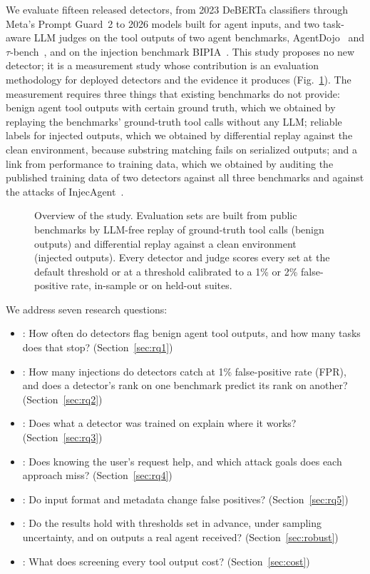 We evaluate fifteen released detectors, from 2023 DeBERTa classifiers through Meta's Prompt Guard~2 to 2026 models built for agent inputs, and two task-aware LLM judges on the tool outputs of two agent benchmarks, AgentDojo~\cite{agentdojo} and $\tau$-bench~\cite{taubench}, and on the injection benchmark BIPIA~\cite{bipia}. This study proposes no new detector; it is a measurement study whose contribution is an evaluation methodology for deployed detectors and the evidence it produces (Fig.~\ref{fig:overview}). The measurement requires three things that existing benchmarks do not provide: benign agent tool outputs with certain ground truth, which we obtained by replaying the benchmarks' ground-truth tool calls without any LLM; reliable labels for injected outputs, which we obtained by differential replay against the clean environment, because substring matching fails on serialized outputs; and a link from performance to training data, which we obtained by auditing the published training data of two detectors against all three benchmarks and against the attacks of InjecAgent~\cite{injecagent}.

\begin{figure}[t]
\centering

\caption{Overview of the study. Evaluation sets are built from public benchmarks by LLM-free replay of ground-truth tool calls (benign outputs) and differential replay against a clean environment (injected outputs). Every detector and judge scores every set at the default threshold or at a threshold calibrated to a 1\% or 2\% false-positive rate, in-sample or on held-out suites.}
\label{fig:overview}
\end{figure}

We address seven research questions:
\begin{itemize}
\item {}: How often do detectors flag benign agent tool outputs, and how many tasks does that stop? (Section~\ref{sec:rq1})
\item {}: How many injections do detectors catch at 1\% false-positive rate (FPR), and does a detector's rank on one benchmark predict its rank on another? (Section~\ref{sec:rq2})
\item {}: Does what a detector was trained on explain where it works? (Section~\ref{sec:rq3})
\item {}: Does knowing the user's request help, and which attack goals does each approach miss? (Section~\ref{sec:rq4})
\item {}: Do input format and metadata change false positives? (Section~\ref{sec:rq5})
\item {}: Do the results hold with thresholds set in advance, under sampling uncertainty, and on outputs a real agent received? (Section~\ref{sec:robust})
\item {}: What does screening every tool output cost? (Section~\ref{sec:cost})
\end{itemize}

